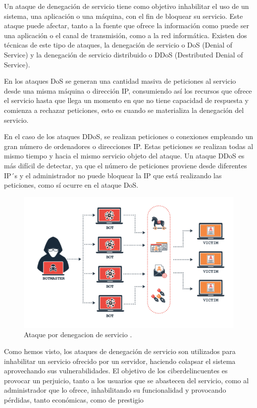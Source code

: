 Un ataque de denegación de servicio tiene como objetivo inhabilitar el uso de un sistema, una aplicación o una máquina, con el fin de bloquear su servicio. Este ataque 
puede afectar, tanto a la fuente que ofrece la información como puede ser una aplicación o el canal de transmisión, como a la red informática. Existen dos técnicas de este tipo de ataques, la denegación de servicio o DoS (Denial of Service) y la denegación de servicio distribuido o DDoS (Destributed Denial of Service).

En los ataques DoS se generan una cantidad masiva de peticiones al servicio desde una misma máquina o dirección IP, consumiendo así los recursos que ofrece el servicio hasta que llega un momento en que no tiene capacidad de respuesta y comienza a rechazar peticiones, esto es cuando se materializa la denegación del servicio.

En el caso de los ataques DDoS, se realizan peticiones o conexiones empleando un gran número de ordenadores o direcciones IP. Estas peticiones se realizan todas al mismo tiempo y hacia el mismo servicio objeto del ataque. Un ataque DDoS es más difícil de detectar, ya que el número de peticiones proviene desde diferentes IP´s y el administrador no puede bloquear la IP que está realizando las peticiones, como sí ocurre en el ataque DoS.

\begin{figure}[tphb]
  		   \centering
     		   \includegraphics[width=5in]{ddos.png}
  		   \caption{Ataque por denegacion de servicio \cite{ddos}.}
  		   \label{img:ddos}
\end{figure}

Como hemos visto, los ataques de denegación de servicio son utilizados para inhabilitar un servicio ofrecido por un servidor, haciendo colapsar el sistema aprovechando sus vulnerabilidades. El objetivo de los ciberdelincuentes es provocar un perjuicio, tanto a los usuarios que se abastecen del servicio, como al administrador que lo ofrece, inhabilitando su funcionalidad y provocando pérdidas, tanto económicas, como de prestigio



